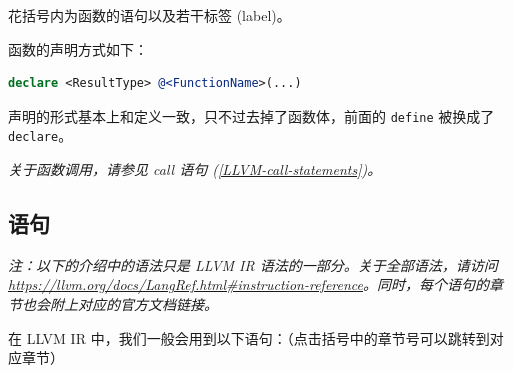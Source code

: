 花括号内为函数的语句以及若干标签 (label)。

函数的声明方式如下：

\begin{lstlisting}[language=llvm]
declare <ResultType> @<FunctionName>(...)
\end{lstlisting}

声明的形式基本上和定义一致，只不过去掉了函数体，前面的 \texttt{define} 被换成了
\texttt{declare}。

\textit{关于函数调用，请参见 call 语句 (\ref{LLVM-call-statements})。}

\subsection{语句}\label{LLVM-statements}

\textit{注：以下的介绍中的语法只是 LLVM IR 语法的一部分。关于全部语法，请访问
\url{https://llvm.org/docs/LangRef.html\#instruction-reference}。同时，每个语句的章节也会附上对应的官方文档链接。}

在 LLVM IR 中，我们一般会用到以下语句：（点击括号中的章节号可以跳转到对应章节）

